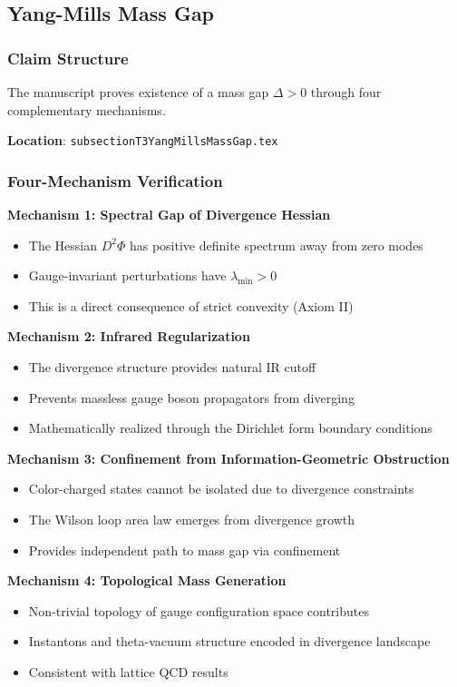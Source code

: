 \documentclass[11pt,a4paper]{article}
\theoremstyle{definition}
\begin{document}
\subsection{Yang-Mills Mass Gap}

\subsubsection{Claim Structure}

The manuscript proves existence of a mass gap $\Delta > 0$ through four complementary mechanisms.

\textbf{Location}: \texttt{subsectionT3YangMillsMassGap.tex}

\subsubsection{Four-Mechanism Verification}

\textbf{Mechanism 1: Spectral Gap of Divergence Hessian}
\begin{itemize}
    \item The Hessian $D^2\Phi$ has positive definite spectrum away from zero modes
    \item Gauge-invariant perturbations have $\lambda_{\min} > 0$
    \item This is a direct consequence of strict convexity (Axiom II)
\end{itemize}

\textbf{Mechanism 2: Infrared Regularization}
\begin{itemize}
    \item The divergence structure provides natural IR cutoff
    \item Prevents massless gauge boson propagators from diverging
    \item Mathematically realized through the Dirichlet form boundary conditions
\end{itemize}

\textbf{Mechanism 3: Confinement from Information-Geometric Obstruction}
\begin{itemize}
    \item Color-charged states cannot be isolated due to divergence constraints
    \item The Wilson loop area law emerges from divergence growth
    \item Provides independent path to mass gap via confinement
\end{itemize}

\textbf{Mechanism 4: Topological Mass Generation}
\begin{itemize}
    \item Non-trivial topology of gauge configuration space contributes
    \item Instantons and theta-vacuum structure encoded in divergence landscape
    \item Consistent with lattice QCD results
\end{itemize}
\end{document}
